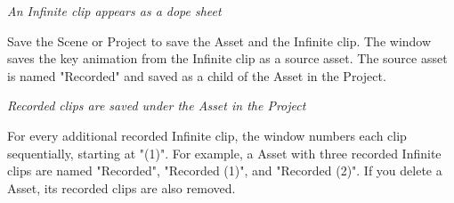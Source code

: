 {\itshape An Infinite clip appears as a dope sheet}

Save the Scene or Project to save the  Asset and the Infinite clip. The  window saves the key animation from the Infinite clip as a source asset. The source asset is named "{}\+Recorded"{} and saved as a child of the  Asset in the Project.



{\itshape Recorded clips are saved under the  Asset in the Project}

For every additional recorded Infinite clip, the  window numbers each clip sequentially, starting at "{}(1)"{}. For example, a  Asset with three recorded Infinite clips are named "{}\+Recorded"{}, "{}\+Recorded (1)"{}, and "{}\+Recorded (2)"{}. If you delete a  Asset, its recorded clips are also removed. 